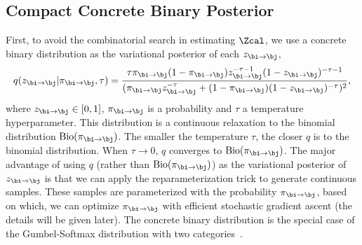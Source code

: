 \subsection{Compact Concrete Binary Posterior}
First,  to avoid the combinatorial search in estimating $\Zcal$, we use a concrete binary distribution as the variational posterior of each $z_{\bi \rightarrow \bj}$,   
\begin{align}
q(z_{\bi \rightarrow \bj}|\pi_{\bi \rightarrow \bj}, \tau) = \frac{\tau\pi_{\bi \rightarrow \bj}(1 - \pi_{\bi \rightarrow \bj})z_{\bi \rightarrow \bj}^{-\tau-1}(1-z_{\bi \rightarrow \bj})^{-\tau-1} }{(\pi_{\bi \rightarrow \bj}z_{\bi \rightarrow \bj}^{-\tau} +(1 - \pi_{\bi \rightarrow \bj})(1-z_{\bi \rightarrow \bj})^{-\tau} )^2},  \label{eq:concrete}
\end{align}
where $z_{\bi \rightarrow \bj} \in [0,1]$,  $\pi_{\bi \rightarrow \bj}$ is a probability and $\tau$ a temperature hyperparameter.  This distribution is a continuous relaxation to the binomial distribution $\mathrm{Bio}(\pi_{\bi \rightarrow \bj})$. %
 The smaller the temperature  $\tau$, the closer $q$ is to the binomial distribution. When $\tau \rightarrow 0$, $q$ converges to $\mathrm{Bio}(\pi_{\bi \rightarrow \bj})$. 
 The major advantage of using $q$ (rather than $\mathrm{Bio}(\pi_{\bi \rightarrow \bj})$) as the variational posterior of $z_{\bi\rightarrow \bj}$ is that we can apply the reparameterization trick to generate continuous samples. These samples are parameterized with the probability $\pi_{\bi \rightarrow \bj}$, based on which, we can optimize $\pi_{\bi \rightarrow \bj}$ with efficient stochastic gradient ascent (the details will be given later). The concrete binary distribution is the special case of the Gumbel-Softmax distribution with two categories~\citep{jang2016categorical}. 
 


